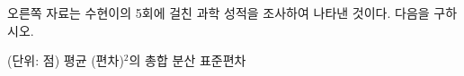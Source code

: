 오른쪽 자료는 수현이의 5회에 걸친 과학 성적을 조사하여 나타낸 것이다. 다음을 구하시오.\par\noindent\hfill{\footnotesize (단위: 점)}
 평균
 (편차)$^2$의 총합
 분산
 표준편차
